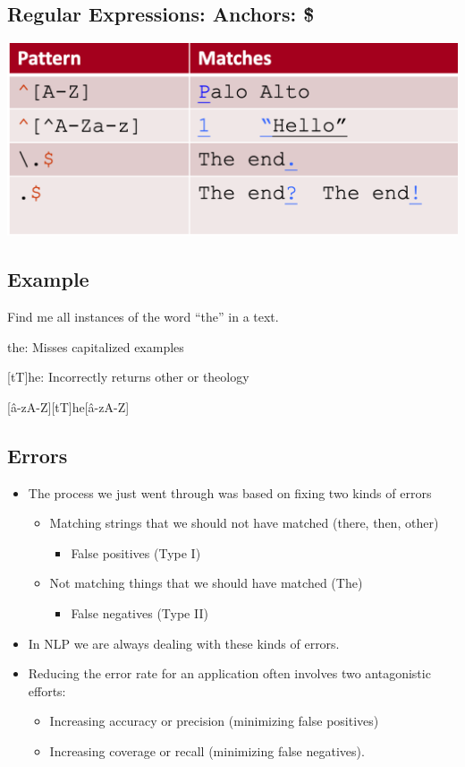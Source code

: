 \documentclass[11pt]{article}
\theoremstyle{definition}
\begin{document}
\subsection{Regular Expressions: Anchors: \^ \$}
\includegraphics[width=\textwidth]{12.png}

\subsection{Example}
Find me all instances of the word “the” in a text.

the: Misses capitalized examples

[tT]he: Incorrectly returns other or theology

[\^a-zA-Z][tT]he[\^a-zA-Z]

\subsection{Errors}
\begin{itemize}
  \item The process we just went through was based on fixing
  two kinds of errors
  \begin{itemize}
    \item Matching strings that we should not have matched (there,
    then, other)
    \begin{itemize}
      \item False positives (Type I)
    \end{itemize}
    \item Not matching things that we should have matched (The)
    \begin{itemize}
      \item False negatives (Type II)
    \end{itemize}
  \end{itemize}
  \item In NLP we are always dealing with these kinds of
  errors.
  \item Reducing the error rate for an application often
  involves two antagonistic efforts:
  \begin{itemize}
    \item Increasing accuracy or precision (minimizing false positives)
    \item Increasing coverage or recall (minimizing false negatives).
  \end{itemize}
\end{itemize}
\end{document}
